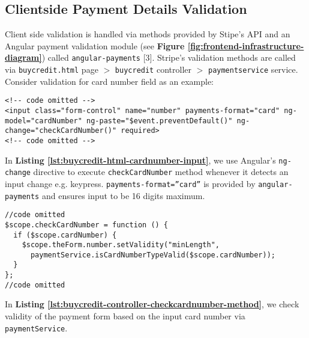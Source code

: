 \subsection{Clientside Payment Details Validation}
\label{subsec:clientside-payment-details-validation}

Client side validation is handled via methods provided by Stipe’s API and an Angular payment validation module  (see \textbf{Figure \ref{fig:frontend-infrastructure-diagram}}) called \texttt{angular-payments} [3]. Stripe’s validation methods are called via \texttt{buycredit.html} page $>$ \texttt{buycredit} controller $>$ \texttt{paymentservice} service. Consider validation for card number field as an example:

\begin{listing}[H]
\begin{verbatim}
<!-- code omitted -->
<input class="form-control" name="number" payments-format="card" ng-model="cardNumber" ng-paste="$event.preventDefault()" ng-change="checkCardNumber()" required>
<!-- code omitted -->
\end{verbatim}
\label{lst:buycredit-html-cardnumber-input}
\end{listing}

In \textbf{Listing \ref{lst:buycredit-html-cardnumber-input}}, we  use Angular’s \texttt{ng-change} directive to execute \texttt{checkCardNumber} method whenever it detects an input change e.g. keypress. \texttt{payments-format=”card”} is provided by \texttt{angular-payments} and ensures input to be 16 digits maximum.\\

\begin{listing}[H]
\begin{verbatim}
//code omitted
$scope.checkCardNumber = function () {
  if ($scope.cardNumber) {
    $scope.theForm.number.setValidity("minLength",
      paymentService.isCardNumberTypeValid($scope.cardNumber));
  }
};
//code omitted
\end{verbatim}
\label{lst:buycredit-controller-checkcardnumber-method}
\end{listing}

In \textbf{Listing \ref{lst:buycredit-controller-checkcardnumber-method}}, we check validity of the payment form based on the input card number via \texttt{paymentService}.\\

